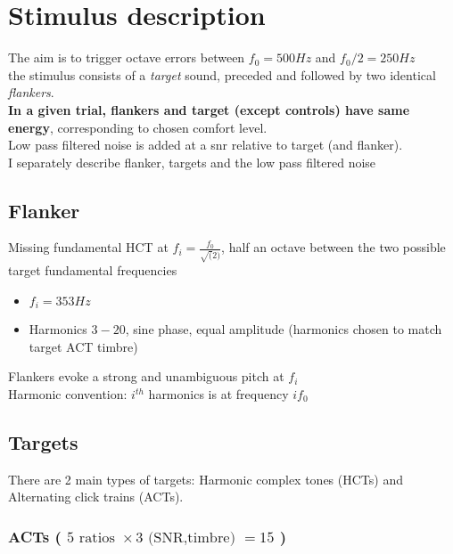 \documentclass[11pt,a4paper,oneside]{article}
\begin{document}
\section{Stimulus description}

The aim is to trigger octave errors between $f_0 = 500Hz$ and $f_0/2 = 250 Hz$\\
the stimulus consists of a \textit{target} sound, preceded and followed by two identical \textit{flankers}.\\

\textbf{In a given trial, flankers and target (except controls) have same energy}, corresponding to chosen comfort level.\\

Low pass filtered noise is added at a snr relative to target (and flanker). \\

I separately describe flanker, targets and the low pass filtered noise

\subsection{Flanker}

Missing fundamental HCT at $f_i = \frac{f_0}{\sqrt(2)}$, half an octave between the two possible target fundamental frequencies

\begin{itemize}
\item $f_i = 353 Hz$
\item Harmonics $3-20$, sine phase, equal amplitude (harmonics chosen to match target ACT timbre)
\end{itemize}

Flankers evoke a strong and unambiguous pitch at $f_i$\\
Harmonic convention: $i^{th}$ harmonics is at frequency $i f_0$
\subsection{Targets}

There are 2 main types of targets: Harmonic complex tones (HCTs) and Alternating click trains (ACTs).

\subsubsection{ACTs (  $5 \text{ ratios } \times 3 \text{ (SNR,timbre) } = 15$  )}
\end{document}
